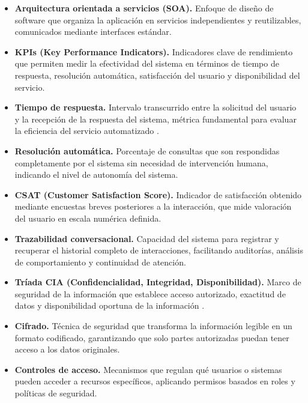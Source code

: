 \begin{itemize}
    \item \textbf{Arquitectura orientada a servicios (SOA).} Enfoque de diseño de software que organiza la aplicación en servicios independientes y reutilizables, comunicados mediante interfaces estándar.

	\item \textbf{KPIs (Key Performance Indicators).} Indicadores clave de rendimiento que permiten medir la efectividad del sistema en términos de tiempo de respuesta, resolución automática, satisfacción del usuario y disponibilidad del servicio.

    \item \textbf{Tiempo de respuesta.} Intervalo transcurrido entre la solicitud del usuario y la recepción de la respuesta del sistema, métrica fundamental para evaluar la eficiencia del servicio automatizado \parencite{iso25010}.

    \item \textbf{Resolución automática.} Porcentaje de consultas que son respondidas completamente por el sistema sin necesidad de intervención humana, indicando el nivel de autonomía del sistema.

    \item \textbf{CSAT (Customer Satisfaction Score).} Indicador de satisfacción obtenido mediante encuestas breves posteriores a la interacción, que mide valoración del usuario en escala numérica definida.

    \item \textbf{Trazabilidad conversacional.} Capacidad del sistema para registrar y recuperar el historial completo de interacciones, facilitando auditorías, análisis de comportamiento y continuidad de atención.

	\item \textbf{Tríada CIA (Confidencialidad, Integridad, Disponibilidad).} Marco de seguridad de la información que establece acceso autorizado, exactitud de datos y disponibilidad oportuna de la información \parencite{iso27001_2022}.

    \item \textbf{Cifrado.} Técnica de seguridad que transforma la información legible en un formato codificado, garantizando que solo partes autorizadas puedan tener acceso a los datos originales.

    \item \textbf{Controles de acceso.} Mecanismos que regulan qué usuarios o sistemas pueden acceder a recursos específicos, aplicando permisos basados en roles y políticas de seguridad.


\end{itemize}
